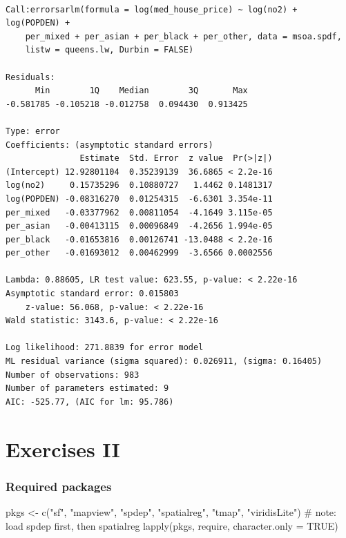 \documentclass[
  letterpaper,
]{scrbook}
\newenvironment{Shaded}{\begin{snugshade}}{\end{snugshade}}
\newcommand{\AttributeTok}[1]{\textcolor[rgb]{0.40,0.45,0.13}{#1}}
\newcommand{\CommentTok}[1]{\textcolor[rgb]{0.37,0.37,0.37}{#1}}
\newcommand{\ConstantTok}[1]{\textcolor[rgb]{0.56,0.35,0.01}{#1}}
\newcommand{\FunctionTok}[1]{\textcolor[rgb]{0.28,0.35,0.67}{#1}}
\newcommand{\NormalTok}[1]{\textcolor[rgb]{0.00,0.23,0.31}{#1}}
\newcommand{\OtherTok}[1]{\textcolor[rgb]{0.00,0.23,0.31}{#1}}
\newcommand{\StringTok}[1]{\textcolor[rgb]{0.13,0.47,0.30}{#1}}
\begin{document}
\begin{verbatim}

Call:errorsarlm(formula = log(med_house_price) ~ log(no2) + log(POPDEN) + 
    per_mixed + per_asian + per_black + per_other, data = msoa.spdf, 
    listw = queens.lw, Durbin = FALSE)

Residuals:
      Min        1Q    Median        3Q       Max 
-0.581785 -0.105218 -0.012758  0.094430  0.913425 

Type: error 
Coefficients: (asymptotic standard errors) 
               Estimate  Std. Error  z value  Pr(>|z|)
(Intercept) 12.92801104  0.35239139  36.6865 < 2.2e-16
log(no2)     0.15735296  0.10880727   1.4462 0.1481317
log(POPDEN) -0.08316270  0.01254315  -6.6301 3.354e-11
per_mixed   -0.03377962  0.00811054  -4.1649 3.115e-05
per_asian   -0.00413115  0.00096849  -4.2656 1.994e-05
per_black   -0.01653816  0.00126741 -13.0488 < 2.2e-16
per_other   -0.01693012  0.00462999  -3.6566 0.0002556

Lambda: 0.88605, LR test value: 623.55, p-value: < 2.22e-16
Asymptotic standard error: 0.015803
    z-value: 56.068, p-value: < 2.22e-16
Wald statistic: 3143.6, p-value: < 2.22e-16

Log likelihood: 271.8839 for error model
ML residual variance (sigma squared): 0.026911, (sigma: 0.16405)
Number of observations: 983 
Number of parameters estimated: 9 
AIC: -525.77, (AIC for lm: 95.786)
\end{verbatim}


\hypertarget{exercises-ii}{%
\chapter{Exercises II}\label{exercises-ii}}

\newcommand{\Exp}{\mathrm{E}}
\newcommand\given[1][]{\:#1\vert\:}
\newcommand{\Cov}{\mathrm{Cov}}
\newcommand{\Var}{\mathrm{Var}}
\newcommand{\rank}{\mathrm{rank}}
\newcommand{\bm}[1]{\boldsymbol{\mathbf{#1}}}

\hypertarget{required-packages-7}{%
\subsection*{Required packages}\label{required-packages-7}}

\begin{Shaded}
\begin{Highlighting}[]
\NormalTok{pkgs }\OtherTok{\textless{}{-}} \FunctionTok{c}\NormalTok{(}\StringTok{"sf"}\NormalTok{, }\StringTok{"mapview"}\NormalTok{, }\StringTok{"spdep"}\NormalTok{, }\StringTok{"spatialreg"}\NormalTok{, }\StringTok{"tmap"}\NormalTok{, }\StringTok{"viridisLite"}\NormalTok{) }\CommentTok{\# note: load spdep first, then spatialreg}
\FunctionTok{lapply}\NormalTok{(pkgs, require, }\AttributeTok{character.only =} \ConstantTok{TRUE}\NormalTok{)}
\end{Highlighting}
\end{Shaded}
\end{document}
